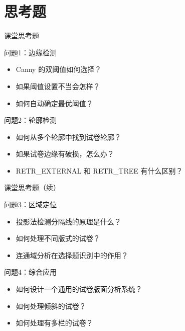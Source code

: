 
\section{思考题}

\begin{frame}{课堂思考题}
    \begin{block}{问题1：边缘检测}
        \begin{itemize}
            \item Canny 的双阈值如何选择？
            \item 如果阈值设置不当会怎样？
            \item 如何自动确定最优阈值？
        \end{itemize}
    \end{block}

    \vspace{0.3cm}

    \begin{block}{问题2：轮廓检测}
        \begin{itemize}
            \item 如何从多个轮廓中找到试卷轮廓？
            \item 如果试卷边缘有破损，怎么办？
            \item RETR\_EXTERNAL 和 RETR\_TREE 有什么区别？
        \end{itemize}
    \end{block}
\end{frame}

\begin{frame}{课堂思考题（续）}
    \begin{block}{问题3：区域定位}
        \begin{itemize}
            \item 投影法检测分隔线的原理是什么？
            \item 如何处理不同版式的试卷？
            \item 连通域分析在选择题识别中的作用？
        \end{itemize}
    \end{block}

    \vspace{0.3cm}

    \begin{block}{问题4：综合应用}
        \begin{itemize}
            \item 如何设计一个通用的试卷版面分析系统？
            \item 如何处理倾斜的试卷？
            \item 如何处理有多栏的试卷？
        \end{itemize}
    \end{block}
\end{frame}

